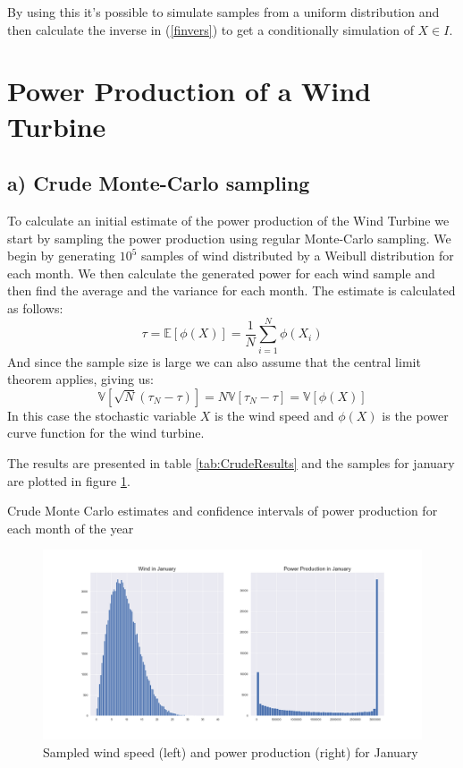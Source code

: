 \documentclass[a4paper]{article}
\begin{document}
By using this it's possible to simulate samples from a uniform distribution and then calculate the inverse in (\ref{finvers}) to get a conditionally simulation of $X \in I$.

\newpage
\section{Power Production of a Wind Turbine}
\label{sec:oneTurbine}

\subsection*{a) Crude Monte-Carlo sampling}
To calculate an initial estimate of the power production of the Wind Turbine we start by sampling the power production using regular Monte-Carlo sampling. We begin by generating $10^5$ samples of wind distributed by a Weibull distribution for each month. We then calculate the generated power for each wind sample and then find the average and the variance for each month. The estimate is calculated as follows:
\begin{equation}
    \tau = \mathbb{E}[\phi(X)] = \frac{1}{N}\sum_{i = 1}^N\phi(X_i)
\end{equation}
And since the sample size is large we can also assume that the central limit theorem applies, giving us:
\begin{equation}
    \mathbb{V}[\sqrt{N}(\tau_N-\tau)] = N\mathbb{V}[\tau_N-\tau] = \mathbb{V}[\phi(X)]
\end{equation}
In this case the stochastic variable $X$ is the wind speed and $\phi(X)$ is the power curve function for the wind turbine.

The results are presented in table \ref{tab:CrudeResults} and the samples for january are plotted in figure \ref{fig:samplesJan}.
\begin{table}[H]
    \centering
    \caption{Crude Monte Carlo estimates and confidence intervals of power production for each month of the year}
    \label{tab:CrudeResults}
    
\end{table}

\begin{figure}[H]
    \centering
    \includegraphics[width = 1.0\textwidth]{images/janCrudeMC}
    \caption{Sampled wind speed (left) and power production (right) for January}
    \label{fig:samplesJan}
\end{figure}
\end{document}
